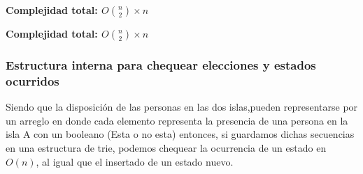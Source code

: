 \begin{algorithm}[H]
\textbf{\hfill Complejidad total: $O\binom{n}{2} \times n$}\\ 
\end{algorithm}

\begin{algorithm}[H]
\textbf{\hfill Complejidad total: $O\binom{n}{2} \times n$}\\ 
\end{algorithm}


\subsubsection{Estructura interna para chequear elecciones y estados ocurridos}

Siendo que la disposici\'on de las personas en las dos islas,pueden representarse por un arreglo en donde cada elemento representa la presencia de una persona en la isla A con un booleano (Esta o no esta) entonces, si guardamos dichas secuencias en una estructura de trie, podemos chequear la ocurrencia de un estado en $O(n)$, al igual que el insertado de un estado nuevo.\\

